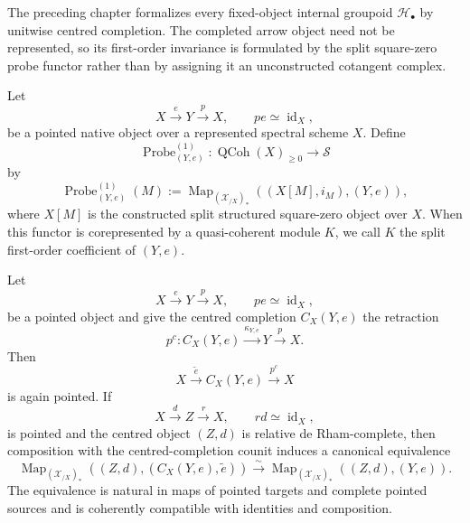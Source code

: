 The preceding chapter formalizes every fixed-object internal groupoid
$\mathcal H_\bullet$ by unitwise centred completion.  The completed arrow
object need not be represented, so its first-order invariance is formulated by
the split square-zero probe functor rather than by assigning it an
unconstructed cotangent complex.

\begin{definition}
\label{def:bnla-split-probe-functor}
Let
\[
    X\xrightarrow{e}Y\xrightarrow{p}X,
    \qquad pe\simeq\operatorname{id}_X,
\]
be a pointed native object over a represented spectral scheme $X$.  Define
\[
    \operatorname{Probe}^{(1)}_{(Y,e)}:
    \operatorname{QCoh}(X)_{\geq0}
    \longrightarrow\mathcal S
\]
by
\[
    \operatorname{Probe}^{(1)}_{(Y,e)}(M)
    :=
    \operatorname{Map}_{(\mathcal X_{/X})_*}
    \left(
        (X[M],i_M),(Y,e)
    \right),
\]
where $X[M]$ is the constructed split structured square-zero object over $X$.
When this functor is corepresented by a quasi-coherent module $K$, we call $K$
the split first-order coefficient of $(Y,e)$.
\end{definition}

\begin{lemma}
\label{lem:bnla-retractive-centred-coreflection}
Let
\[
    X\xrightarrow{e}Y\xrightarrow{p}X,
    \qquad pe\simeq\operatorname{id}_X,
\]
be a pointed object and give the centred completion
$C_X(Y,e)$ the retraction
\[
    p^c:
    C_X(Y,e)\xrightarrow{\kappa_{Y,e}}Y\xrightarrow{p}X.
\]
Then
\[
    X\xrightarrow{\widetilde e}C_X(Y,e)\xrightarrow{p^c}X
\]
is again pointed.  If
\[
    X\xrightarrow{d}Z\xrightarrow{r}X,
    \qquad rd\simeq\operatorname{id}_X,
\]
is pointed and the centred object $(Z,d)$ is relative de Rham-complete, then
composition with the centred-completion counit induces a canonical equivalence
\[
\boxed{
    \operatorname{Map}_{(\mathcal X_{/X})_*}
    \left(
        (Z,d),(C_X(Y,e),\widetilde e)
    \right)
    \xrightarrow{\sim}
    \operatorname{Map}_{(\mathcal X_{/X})_*}
    \left(
        (Z,d),(Y,e)
    \right).}
\]
The equivalence is natural in maps of pointed targets and complete pointed
sources and is coherently compatible with identities and composition.
\end{lemma}

